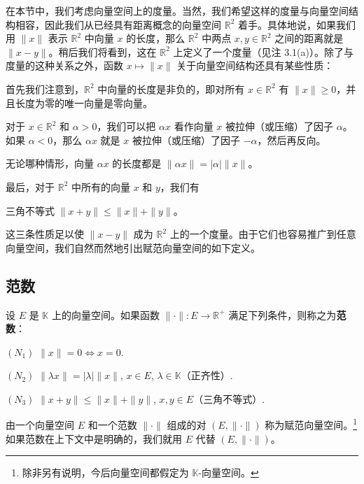 在本节中，我们考虑向量空间上的度量。当然，我们希望这样的度量与向量空间结构相容，因此我们从已经具有距离概念的向量空间 $ \mathbb{R}^2 $ 着手。具体地说，如果我们用 $ \|x\| $ 表示 $ \mathbb{R}^2 $ 中向量 $ x $ 的长度，那么 $\mathbb{R}^2$ 中两点 $ x, y \in \mathbb{R}^2 $ 之间的距离就是 $ \|x - y\| $。稍后我们将看到，这在 $ \mathbb{R}^2 $ 上定义了一个度量（见注 3.1(a)）。除了与度量的这种关系之外，函数 $ x \mapsto \|x\| $ 关于向量空间结构还具有某些性质：

首先我们注意到，$ \mathbb{R}^2 $ 中向量的长度是非负的，即对所有 $ x \in \mathbb{R}^2 $ 有 $ \|x\| \geq 0 $，并且长度为零的唯一向量是零向量。

对于 $ x \in \mathbb{R}^2 $ 和 $ \alpha > 0 $，我们可以把 $ \alpha x $ 看作向量 $ x $ 被拉伸（或压缩）了因子 $ \alpha $。如果 $ \alpha < 0 $，那么 $ \alpha x $ 就是 $ x $ 被拉伸（或压缩）了因子 $ -\alpha $，然后再反向。


无论哪种情形，向量 $ \alpha x $ 的长度都是 $ \|\alpha x\| = |\alpha|\|x\| $。

最后，对于 $ \mathbb{R}^2 $ 中所有的向量 $ x $ 和 $ y $，我们有

三角不等式 $ \|x + y\| \leq \|x\| + \|y\| $。

这三条性质足以使 $ \|x - y\| $ 成为 $ \mathbb{R}^2 $ 上的一个度量。由于它们也容易推广到任意向量空间，我们自然而然地引出赋范向量空间的如下定义。


\subsection*{范数}

设 $ E $ 是 $ \mathbb{K} $ 上的向量空间。如果函数 $ \|\cdot\|: E \to \mathbb{R}^+ $ 满足下列条件，则称之为\textbf{范数}：

$ (N_1) $  $ \|x\| = 0 \Leftrightarrow x = 0 $.

$ (N_2) $  $ \|\lambda x\| = |\lambda|\|x\| $,  $ x \in E $,  $ \lambda \in \mathbb{K} $（正齐性）.

$ (N_3) $  $ \|x + y\| \leq \|x\| + \|y\| $,  $ x, y \in E $（三角不等式）.

由一个向量空间 $E$ 和一个范数 $\|\cdot\|$ 组成的对 $(E, \|\cdot\|)$ 称为赋范向量空间。\footnote{除非另有说明，今后向量空间都假定为 $\mathbb K$-向量空间。}如果范数在上下文中是明确的，我们就用 $E$ 代替 $(E, \|\cdot\|)$。

